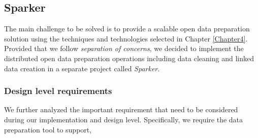 \subsection{Sparker}
\label{sec:sparker}
The main challenge to be solved is to provide a scalable open data preparation solution using the techniques and technologies selected in Chapter \ref{Chapter4}. Provided that we follow \textit{separation of concerns}, we decided to implement the distributed open data preparation operations including data cleaning and linked data creation in a separate project called \textit{Sparker}. 
\subsubsection{Design level requirements}
\label{designreq}
We further analyzed the important requirement that need to be considered during our implementation and design level. Specifically, we require the data preparation tool to support,
